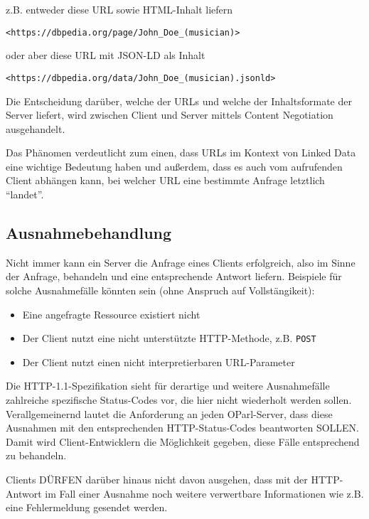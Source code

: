 \documentclass[,a4paper]{article}
\begin{document}
z.B. entweder diese URL sowie HTML-Inhalt liefern

\begin{verbatim}
<https://dbpedia.org/page/John_Doe_(musician)>
\end{verbatim}

oder aber diese URL mit JSON-LD als Inhalt

\begin{verbatim}
<https://dbpedia.org/data/John_Doe_(musician).jsonld>
\end{verbatim}

Die Entscheidung darüber, welche der URLs und welche der Inhaltsformate
der Server liefert, wird zwischen Client und Server mittels Content
Negotiation ausgehandelt.

Das Phänomen verdeutlicht zum einen, dass URLs im Kontext von Linked
Data eine wichtige Bedeutung haben und außerdem, dass es auch vom
aufrufenden Client abhängen kann, bei welcher URL eine bestimmte Anfrage
letztlich ``landet''.

\subsection{Ausnahmebehandlung}\label{ausnahmebehandlung}

Nicht immer kann ein Server die Anfrage eines Clients erfolgreich, also
im Sinne der Anfrage, behandeln und eine entsprechende Antwort liefern.
Beispiele für solche Ausnahmefälle könnten sein (ohne Anspruch auf
Vollstängikeit):

\begin{itemize}
\item
  Eine angefragte Ressource existiert nicht
\item
  Der Client nutzt eine nicht unterstützte HTTP-Methode, z.B.
  \texttt{POST}
\item
  Der Client nutzt einen nicht interpretierbaren URL-Parameter
\end{itemize}

Die HTTP-1.1-Spezifikation sieht für derartige und weitere Ausnahmefälle
zahlreiche spezifische Status-Codes vor, die hier nicht wiederholt
werden sollen. Verallgemeinernd lautet die Anforderung an jeden
OParl-Server, dass diese Ausnahmen mit den entsprechenden
HTTP-Status-Codes beantworten SOLLEN. Damit wird Client-Entwicklern die
Möglichkeit gegeben, diese Fälle entsprechend zu behandeln.

Clients DÜRFEN darüber hinaus nicht davon ausgehen, dass mit der
HTTP-Antwort im Fall einer Ausnahme noch weitere verwertbare
Informationen wie z.B. eine Fehlermeldung gesendet werden.
\end{document}
